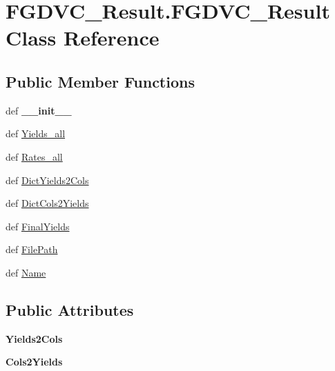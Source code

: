 \hypertarget{classFGDVC__Result_1_1FGDVC__Result}{\section{\-F\-G\-D\-V\-C\-\_\-\-Result.\-F\-G\-D\-V\-C\-\_\-\-Result \-Class \-Reference}
\label{classFGDVC__Result_1_1FGDVC__Result}
}
\subsection*{\-Public \-Member \-Functions}
\begin{DoxyCompactItemize}
\item 
\hypertarget{classFGDVC__Result_1_1FGDVC__Result_a2214547494b8e49e33681f05d5560939}{def {\bfseries \-\_\-\-\_\-init\-\_\-\-\_\-}}\label{classFGDVC__Result_1_1FGDVC__Result_a2214547494b8e49e33681f05d5560939}

\item 
def \hyperlink{classFGDVC__Result_1_1FGDVC__Result_a96334603fc6df5e0e13b0c63d69936eb}{\-Yields\-\_\-all}
\item 
def \hyperlink{classFGDVC__Result_1_1FGDVC__Result_a89d6e2a6ece5e2beb03187011fb5f4bb}{\-Rates\-\_\-all}
\item 
def \hyperlink{classFGDVC__Result_1_1FGDVC__Result_a81a8ca345a6d024a3c33568dbbcb119e}{\-Dict\-Yields2\-Cols}
\item 
def \hyperlink{classFGDVC__Result_1_1FGDVC__Result_a415f223456d256d52afea60b74916676}{\-Dict\-Cols2\-Yields}
\item 
def \hyperlink{classFGDVC__Result_1_1FGDVC__Result_ad3c91913db48efad9c33a0f2d87b9bfb}{\-Final\-Yields}
\item 
def \hyperlink{classFGDVC__Result_1_1FGDVC__Result_a778588f293b3b544482f26ab63fe3d57}{\-File\-Path}
\item 
def \hyperlink{classFGDVC__Result_1_1FGDVC__Result_ad85ce8419074dca37993ce9a4665dddd}{\-Name}
\end{DoxyCompactItemize}
\subsection*{\-Public \-Attributes}
\begin{DoxyCompactItemize}
\item 
\hypertarget{classFGDVC__Result_1_1FGDVC__Result_aa52ef0bb67b48d181097912e5fe1741f}{{\bfseries \-Yields2\-Cols}}\label{classFGDVC__Result_1_1FGDVC__Result_aa52ef0bb67b48d181097912e5fe1741f}

\item 
\hypertarget{classFGDVC__Result_1_1FGDVC__Result_ab73aa267199cb6ea215b27776066daba}{{\bfseries \-Cols2\-Yields}}\label{classFGDVC__Result_1_1FGDVC__Result_ab73aa267199cb6ea215b27776066daba}

\end{DoxyCompactItemize}


